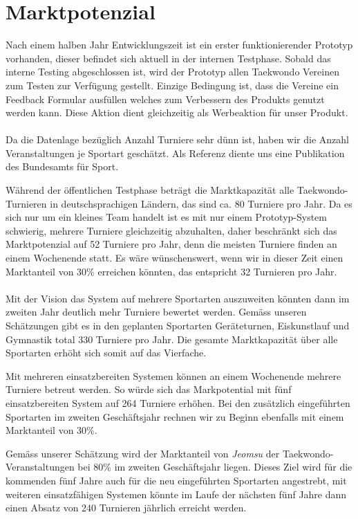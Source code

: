 \section{Marktpotenzial}\label{marktpotenzial}

Nach einem halben Jahr Entwicklungszeit ist ein erster funktionierender Prototyp vorhanden, dieser befindet sich aktuell in
der internen Testphase.
Sobald das interne Testing abgeschlossen ist, wird der Prototyp allen Taekwondo Vereinen zum Testen zur Verfügung gestellt.
Einzige Bedingung ist, dass die Vereine ein Feedback Formular ausfüllen welches zum Verbessern des Produkts genutzt werden kann.
Diese Aktion dient gleichzeitig als Werbeaktion für unser Produkt.
\\\\

Da die Datenlage bezüglich Anzahl Turniere sehr dünn ist, haben wir die Anzahl Veranstaltungen je Sportart geschätzt.
Als Referenz diente uns eine Publikation des Bundesamts für Sport. \parencite[S.~9]{baspo}

Während der öffentlichen Testphase beträgt die Marktkapazität alle Taekwondo-Turnieren in deutschsprachigen Ländern, das
sind ca. 80 Turniere pro Jahr.
Da es sich nur um ein kleines Team handelt ist es mit nur einem Prototyp-System schwierig, mehrere Turniere
	gleichzeitig abzuhalten, daher beschränkt sich das Marktpotenzial auf 52 Turniere pro Jahr, denn die meisten
	Turniere finden an einem Wochenende statt.
Es wäre wünschenswert, wenn wir in dieser Zeit einen Marktanteil von 30\% erreichen könnten, das entspricht 32
	Turnieren pro Jahr.
\\\\

Mit der Vision das System auf mehrere Sportarten auszuweiten könnten dann im zweiten Jahr deutlich mehr Turniere bewertet werden.
Gemäss unseren Schätzungen gibt es in den geplanten Sportarten Geräteturnen, Eiskunstlauf und Gymnastik total 330 Turniere pro Jahr.
Die gesamte Marktkapazität über alle Sportarten erhöht sich somit auf das Vierfache.

Mit mehreren einsatzbereiten Systemen können an einem Wochenende mehrere Turniere betreut werden.
So würde sich das Markpotential mit fünf einsatzbereiten System auf 264 Turniere erhöhen.
Bei den zusätzlich eingeführten Sportarten im zweiten Geschäftsjahr rechnen wir zu Beginn ebenfalls mit einem Marktanteil von 30\%.

Gemäss unserer Schätzung wird der Marktanteil von \textit{Jeomsu} der Taekwondo-Veranstaltungen bei 80\% im zweiten Geschäftsjahr liegen.
Dieses Ziel wird für die kommenden fünf Jahre auch für die neu eingeführten Sportarten angestrebt, mit weiteren
	einsatzfähigen Systemen könnte im Laufe der nächsten fünf Jahre dann einen Absatz von 240 Turnieren jährlich
	erreicht werden.



